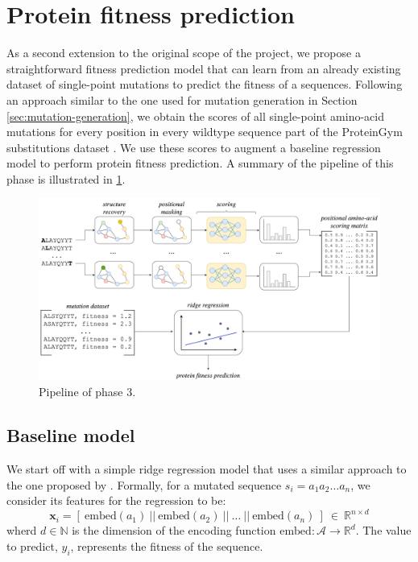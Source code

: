 \section{Protein fitness prediction}
As a second extension to the original scope of the project, we propose a straightforward fitness prediction model that can learn from an already existing dataset of single-point mutations to predict the fitness of a sequences. Following an approach similar to the one used for mutation generation in Section \ref{sec:mutation-generation}, we obtain the scores of all single-point amino-acid mutations for every position in every wildtype sequence part of the ProteinGym substitutions dataset \cite{tranception}. We use these scores to augment a baseline regression model to perform protein fitness prediction. A summary of the pipeline of this phase is illustrated in \ref{fitness-prediction}.

\begin{figure}
    \centering
    \includegraphics[width=\textwidth]{masters-report/figures/protein_fitness_prediction.png}
    \caption{Pipeline of phase 3.}
    \label{fitness-prediction}
\end{figure}

\subsection{Baseline model} 
We start off with a simple ridge regression model that uses a similar approach to the one proposed by \citet{chloe-hsu}. Formally, for a mutated sequence $s_i = a_1a_2\dots a_n$, we consider its features for the regression to be:
\begin{equation}
    \mathbf{x}_i = [~\text{embed}(a_1) ~||~ \text{embed}(a_2) ~||~ \dots ~||~\text{embed}(a_n)~] ~\in~\mathbb{R}^{n \times d} 
\label{baseline-regression}
\end{equation}
wherd $d\in\mathbb{N}$ is the dimension of the encoding function $\text{embed}:\mathcal{A}\rightarrow \mathbb{R}^d$. The value to predict, $y_i$, represents the fitness of the sequence.

